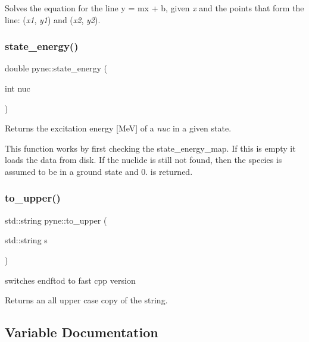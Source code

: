 Solves the equation for the line y = mx + b, given {\itshape x} and the points that form the line\+: ({\itshape x1}, {\itshape y1}) and ({\itshape x2}, {\itshape y2}). \mbox{\label{namespacepyne_ada1a23281a3a62267fbd355bd48da2e6}} 
\subsubsection{\texorpdfstring{state\+\_\+energy()}{state\_energy()}}
{\footnotesize\ttfamily double pyne\+::state\+\_\+energy (\begin{DoxyParamCaption}\item[{int}]{nuc }\end{DoxyParamCaption})}



Returns the excitation energy \mbox{[}MeV\mbox{]} of a {\itshape nuc} in a given state. 

This function works by first checking the state\+\_\+energy\+\_\+map. If this is empty it loads the data from disk. If the nuclide is still not found, then the species is assumed to be in a ground state and 0. is returned. \mbox{\label{namespacepyne_aa02f7d3ceda305d11379f2f778e4d645}} 
\subsubsection{\texorpdfstring{to\+\_\+upper()}{to\_upper()}}
{\footnotesize\ttfamily std\+::string pyne\+::to\+\_\+upper (\begin{DoxyParamCaption}\item[{std\+::string}]{s }\end{DoxyParamCaption})}



switches endftod to fast cpp version 

Returns an all upper case copy of the string. 

\subsection{Variable Documentation}
\mbox{\label{namespacepyne_a70711189f1078e2ebc132db9ce7ab0a7}} 
